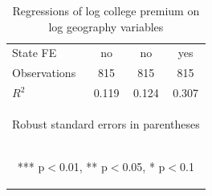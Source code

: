 \documentclass[12 pt]{article}
\begin{document}
\begin{table}[H]
\begin{tabular}{lccc}
    State FE & \mbox{no} & \mbox{no} & \mbox{yes} \\
    Observations & 815 & 815 & 815 \\
     $R^2$ & 0.119 & 0.124 & 0.307 \\ \midrule
    \multicolumn{4}{c}{\begin{footnotesize} Robust standard errors in parentheses\end{footnotesize}} \\
    \multicolumn{4}{c}{\begin{footnotesize} *** p$<$0.01, ** p$<$0.05, * p$<$0.1\end{footnotesize}} \\
    \end{tabular}
    \caption{Regressions of log college premium on log geography variables}
    \label{tab:skill_reg}
\end{table}
\end{document}
